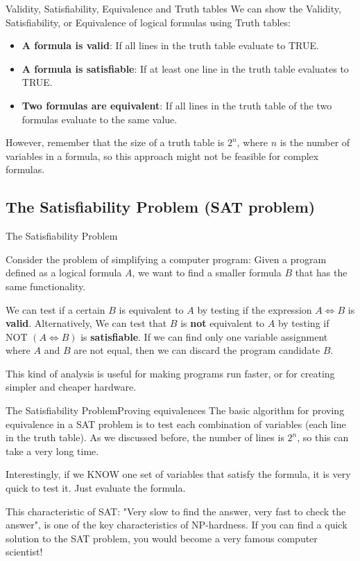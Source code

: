 \begin{frame}{Validity, Satisfiability, Equivalence and Truth tables}
  We can show the Validity, Satisfiability, or Equivalence of logical formulas using Truth tables:\bigskip

  \begin{itemize}
    \item {\bf A formula is valid}: If all lines in the truth table evaluate to TRUE.
    \item {\bf A formula is satisfiable}: If at least one line in the truth table evaluates to TRUE.
    \item {\bf Two formulas are equivalent}: If all lines in the truth table of the two formulas evaluate to the same value.
  \end{itemize}\bigskip

  However, remember that the size of a truth table is $2^n$, where $n$ is the number of variables in a formula, so this approach might not be feasible for complex formulas.
\end{frame}


\subsection{The Satisfiability Problem (SAT problem)}

\begin{frame}{The Satisfiability Problem}

  Consider the problem of simplifying a computer program: Given a program defined as a logical formula $A$, we want to find a smaller formula $B$ that has the same functionality.\vfill

  We can test if a certain $B$ is equivalent to $A$ by testing if the expression $A \iff B$ is {\bf valid}. Alternatively, We can test that $B$ is {\bf not} equivalent to $A$ by testing if $\text{NOT }(A \iff B)$ is {\bf satisfiable}. If we can find only one variable assignment where $A$ and $B$ are not equal, then we can discard the program candidate $B$.\vfill

  This kind of analysis is useful for making programs run faster, or for creating simpler and cheaper hardware.
\end{frame}

\begin{frame}{The Satisfiability Problem}{Proving equivalences}
  The basic algorithm for proving equivalence in a SAT problem is to test each combination of variables (each line in the truth table). As we discussed before, the number of lines is $2^n$, so this can take a very long time.\vfill

  Interestingly, if we KNOW one set of variables that satisfy the formula, it is very quick to test it. Just evaluate the formula.\vfill

  This characteristic of SAT: "Very slow to find the answer, very fast to check the answer", is one of the key characteristics of NP-hardness. If you can find a quick solution to the SAT problem, you would become a very famous computer scientist!
\end{frame}
